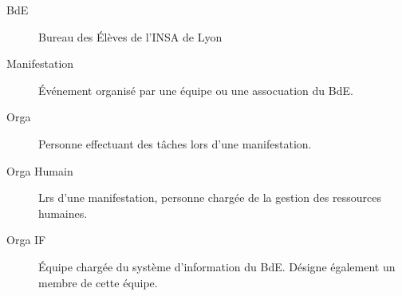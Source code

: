 \begin{description}
\item[BdE] Bureau des Élèves de l'INSA de Lyon
\item[Manifestation] Événement organisé par une équipe ou une assocuation du BdE.
\item[Orga] Personne effectuant des tâches lors d'une manifestation.
\item[Orga Humain] Lrs d'une manifestation, personne chargée de la gestion des ressources humaines.
\item[Orga IF] Équipe chargée du système d'information du BdE. Désigne également un membre de cette équipe.

 \end{description}